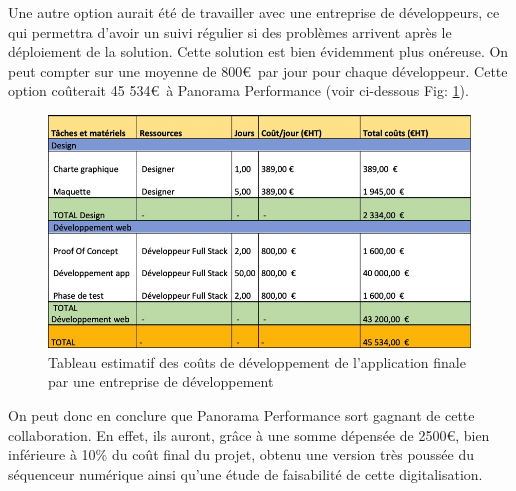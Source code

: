 Une autre option aurait été de travailler avec une entreprise de développeurs, ce qui permettra d’avoir un suivi régulier si des problèmes arrivent après le déploiement de la solution. Cette solution est bien évidemment plus onéreuse. On peut compter sur une moyenne de 800\euro~par jour pour chaque développeur. Cette option coûterait 45 534\euro~à Panorama Performance (voir ci-dessous Fig:  \ref{fig:TabEstimationAppDev}).


\begin{figure}[!h]
    \centering
    \includegraphics[scale=0.5]{img/estimation_prix_projetDev.jpeg}
    \caption{Tableau estimatif des coûts de développement de l'application finale par une entreprise de développement}
    \label{fig:TabEstimationAppDev}
\end{figure}


On peut donc en conclure que Panorama Performance sort gagnant de cette collaboration. En effet, ils auront, grâce à une somme dépensée de 2500\euro, bien inférieure à 10\% du coût final du projet, obtenu une version très poussée du séquenceur numérique ainsi qu’une étude de faisabilité de cette digitalisation.